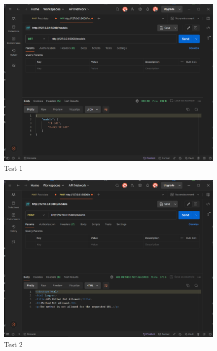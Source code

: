 \begin{figure}[htbp]
    \centering
    \includegraphics[width=1\textwidth]{../../assets/test_1_models.png}
    \caption{Test 1}
    \label{fig:test1models}
\end{figure}
\begin{figure}[htbp]
    \centering
    \includegraphics[width=1\textwidth]{../../assets/test_2_models.png}
    \caption{Test 2}
    \label{fig:test2models}
\end{figure}